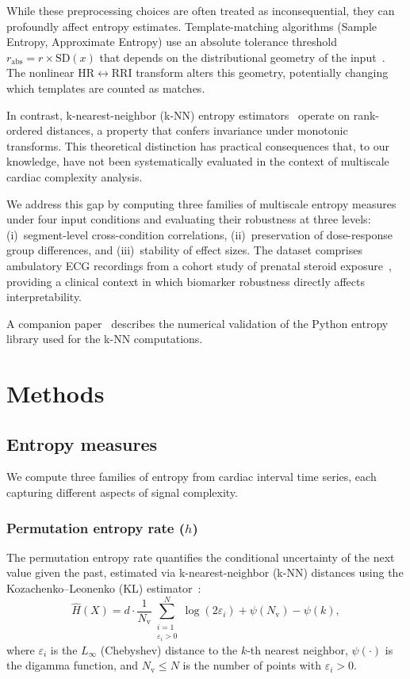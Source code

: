\documentclass[12pt,a4paper]{article}
\begin{document}
While these preprocessing choices are often treated as inconsequential, they can profoundly affect entropy estimates.
Template-matching algorithms (Sample Entropy, Approximate Entropy) use an absolute tolerance threshold $r_{\text{abs}} = r \times \text{SD}(x)$ that depends on the distributional geometry of the input~\citep{richman2000}.
The nonlinear HR$\leftrightarrow$RRI transform alters this geometry, potentially changing which templates are counted as matches.

In contrast, k-nearest-neighbor (k-NN) entropy estimators~\citep{kozachenko1987,kraskov2004} operate on rank-ordered distances, a property that confers invariance under monotonic transforms.
This theoretical distinction has practical consequences that, to our knowledge, have not been systematically evaluated in the context of multiscale cardiac complexity analysis.

We address this gap by computing three families of multiscale entropy measures under four input conditions and evaluating their robustness at three levels: (i)~segment-level cross-condition correlations, (ii)~preservation of dose-response group differences, and (iii)~stability of effect sizes.
The dataset comprises ambulatory ECG recordings from a cohort study of prenatal steroid exposure~\citep{frasch2024}, providing a clinical context in which biomarker robustness directly affects interpretability.

A companion paper~\citep{garnier2026} describes the numerical validation of the Python entropy library used for the k-NN computations.


\section{Methods}\label{sec:methods}

\subsection{Entropy measures}\label{sec:entropy}

We compute three families of entropy from cardiac interval time series, each capturing different aspects of signal complexity.

\subsubsection{Permutation entropy rate ($h$)}

The permutation entropy rate quantifies the conditional uncertainty of the next value given the past, estimated via k-nearest-neighbor (k-NN) distances using the Kozachenko--Leonenko (KL) estimator~\citep{kozachenko1987}:
\begin{equation}\label{eq:kl}
  \hat{H}(X) = d \cdot \frac{1}{N_{\text{v}}} \sum_{\substack{i=1 \\ \varepsilon_i > 0}}^{N} \log(2\varepsilon_i)
  + \psi(N_{\text{v}}) - \psi(k),
\end{equation}
where $\varepsilon_i$ is the $L_\infty$ (Chebyshev) distance to the $k$-th nearest neighbor, $\psi(\cdot)$ is the digamma function, and $N_{\text{v}} \leq N$ is the number of points with $\varepsilon_i > 0$.
\end{document}
